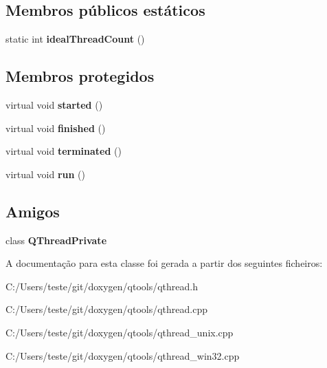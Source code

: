\subsection*{Membros públicos estáticos}
\begin{DoxyCompactItemize}
\item 
\hypertarget{class_q_thread_ae464d5eb186bf15869bac8a3f801360e}{static int {\bfseries ideal\-Thread\-Count} ()}\label{class_q_thread_ae464d5eb186bf15869bac8a3f801360e}

\end{DoxyCompactItemize}
\subsection*{Membros protegidos}
\begin{DoxyCompactItemize}
\item 
\hypertarget{class_q_thread_a4a609317b58ece084e279fbc6708acf1}{virtual void {\bfseries started} ()}\label{class_q_thread_a4a609317b58ece084e279fbc6708acf1}

\item 
\hypertarget{class_q_thread_a843a8659972368d1929707ce60877936}{virtual void {\bfseries finished} ()}\label{class_q_thread_a843a8659972368d1929707ce60877936}

\item 
\hypertarget{class_q_thread_a1c1071ede2d1e4e6748e7a6284b35fef}{virtual void {\bfseries terminated} ()}\label{class_q_thread_a1c1071ede2d1e4e6748e7a6284b35fef}

\item 
\hypertarget{class_q_thread_a72fcb26a14f6beb1c3fbace9ab3e7dbb}{virtual void {\bfseries run} ()}\label{class_q_thread_a72fcb26a14f6beb1c3fbace9ab3e7dbb}

\end{DoxyCompactItemize}
\subsection*{Amigos}
\begin{DoxyCompactItemize}
\item 
\hypertarget{class_q_thread_a2e612ca58844e5eaa40195970aa02cf5}{class {\bfseries Q\-Thread\-Private}}\label{class_q_thread_a2e612ca58844e5eaa40195970aa02cf5}

\end{DoxyCompactItemize}


A documentação para esta classe foi gerada a partir dos seguintes ficheiros\-:\begin{DoxyCompactItemize}
\item 
C\-:/\-Users/teste/git/doxygen/qtools/qthread.\-h\item 
C\-:/\-Users/teste/git/doxygen/qtools/qthread.\-cpp\item 
C\-:/\-Users/teste/git/doxygen/qtools/qthread\-\_\-unix.\-cpp\item 
C\-:/\-Users/teste/git/doxygen/qtools/qthread\-\_\-win32.\-cpp\end{DoxyCompactItemize}
